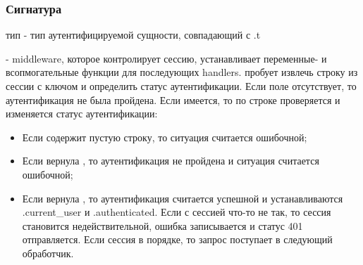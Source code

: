 \subsubsection{Сигнатура\label{signature}}%
\label{page-FPauth-core-module-FPauth+u+core-module-Session+u+manager-module-Make-type-entity}\begin{ocamlindent}тип  - тип аутентифицируемой сущности, совпадающий с .t\end{ocamlindent}%
\medbreak
\label{page-FPauth-core-module-FPauth+u+core-module-Session+u+manager-module-Make-val-auth+u+setup}\begin{ocamlindent} - middleware, которое контролирует сессию, устанавливает переменные- и всопмогательные функции для последующих handlers. пробует извлечь строку из сессии с ключом  и определить статус аутентификации. Если поле  отсутствует, то аутентификация не была пройдена. Если  имеется, то по строке проверяется и изменяется статус аутентификации:\begin{itemize}\item{Если  содержит пустую строку, то ситуация считается ошибочной;}%
\item{Если \hyperref[page-FPauth-core-module-FPauth+u+core-module-Session+u+manager-module-Make-argument-1-M-val-deserialize]{} вернула , то аутентификация не пройдена и ситуация считается ошибочной;}%
\item{Если \hyperref[page-FPauth-core-module-FPauth+u+core-module-Session+u+manager-module-Make-argument-1-M-val-deserialize]{} вернула , то аутентификация считается успешной и устанавливаются .current\_user и .authenticated. Если с сессией что-то не так, то сессия становится недействительной, ошибка записывается и статус 401 отправляется. Если сессия в порядке, то запрос поступает в следующий обработчик.}\end{itemize}%
\end{ocamlindent}%
\medbreak


